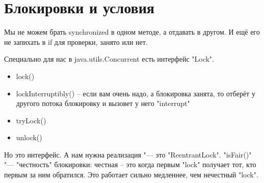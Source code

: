 \section{Блокировки и условия}
	Мы не можем брать synchronized в одном методе, а отдавать в другом. И ещё его не запихать в if для проверки, занято или нет.

	Специально для нас в java.utils.Concurrent есть интерфейс \java"Lock".
	\begin{itemize}
	\item
		lock()
	\item
		lockInterruptibly() -- если вам очень надо, а блокировка занята, то отберёт у другого потока %
		блокировку и вызовет у него%
		\java"interrupt"
	\item
		tryLock()
	\item
		unlock()
	\end{itemize}
	
	Но это интерфейс. А нам нужна реализация "--- это \java"ReentrantLock".
	\java"isFair()" "--- "честность" блокировки: честная -- это когда первым \java"lock" получает тот, кто первым за ним обратился.
	Это работает сильно медленнее, чем нечестный \java"lock".
